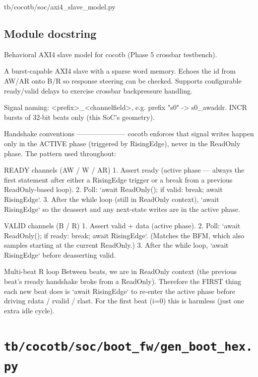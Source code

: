 \begin{relocated}{tb/cocotb/soc/axi4_slave_model.py}

\subsection*{Module docstring}

\begin{textblock}
Behavioral AXI4 slave model for cocotb (Phase 5 crossbar testbench).

A burst-capable AXI4 slave with a sparse word memory.  Echoes the id from
AW/AR onto B/R so response steering can be checked.  Supports configurable
ready/valid delays to exercise crossbar backpressure handling.

Signal naming: <prefix>_<channelfield>, e.g. prefix "s0" -> s0_awaddr.
INCR bursts of 32-bit beats only (this SoC's geometry).

Handshake conventions
---------------------
cocotb enforces that signal writes happen only in the ACTIVE phase (triggered
by RisingEdge), never in the ReadOnly phase.  The pattern used throughout:

READY channels (AW / W / AR)
1. Assert ready (active phase — always the first statement after either
a RisingEdge trigger or a break from a previous ReadOnly-based loop).
2. Poll: `await ReadOnly(); if valid: break; await RisingEdge`.
3. After the while loop (still in ReadOnly context), `await RisingEdge`
so the deassert and any next-state writes are in the active phase.

VALID channels (B / R)
1. Assert valid + data (active phase).
2. Poll: `await ReadOnly(); if ready: break; await RisingEdge`.
(Matches the BFM, which also samples starting at the current ReadOnly.)
3. After the while loop, `await RisingEdge` before deasserting valid.

Multi-beat R loop
Between beats, we are in ReadOnly context (the previous beat's rready
handshake broke from a ReadOnly).  Therefore the FIRST thing each new
beat does is `await RisingEdge` to re-enter the active phase before
driving rdata / rvalid / rlast.  For the first beat (i=0) this is
harmless (just one extra idle cycle).
\end{textblock}

\end{relocated}

\section{\texttt{tb/cocotb/soc/boot\_fw/gen\_boot\_hex.py}}\label{tm:suite:soc-boot-fw-gen-boot-hex}

